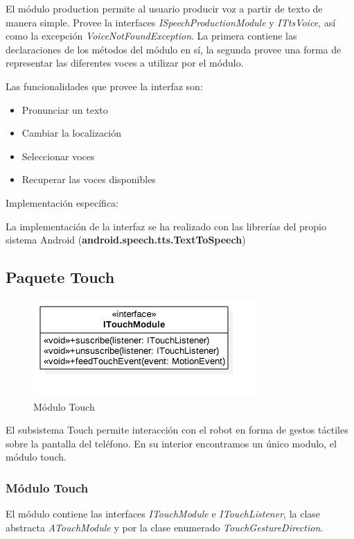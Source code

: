 El módulo production permite al usuario producir voz a partir de texto de manera simple.
Provee la interfaces \textit{ISpeechProductionModule} y \textit{ITtsVoice}, así como la excepción \textit{VoiceNotFoundException}.
La primera contiene las declaraciones de los métodos del módulo en sí, la segunda provee una forma de representar las diferentes voces a utilizar por el módulo.

Las funcionalidades que provee la interfaz son:

\begin{itemize}
	\item Pronunciar un texto
	\item Cambiar la localización 
	\item Seleccionar voces
	\item Recuperar las voces disponibles
\end{itemize}

 


Implementación específica:

La implementación de la interfaz se ha realizado con las librerías del propio sistema Android (\textbf{android.speech.tts.TextToSpeech})

\newpage
\subsection{Paquete Touch}


\begin{figure}
	\centering
	\includegraphics[width=0.6\linewidth]{imagenes/ITouchModule.png}
	\caption{Módulo Touch}
	\label{fig:touch-module}
\end{figure}


El subsistema Touch permite interacción con el robot en forma de gestos táctiles sobre la pantalla del teléfono. En su interior encontramos un único modulo, el módulo touch.

\subsubsection{Módulo Touch}
El módulo contiene las interfaces \textit{ITouchModule} e \textit{ITouchListener}, la clase abstracta \textit{ATouchModule} y por la clase enumerado \textit{TouchGestureDirection}.

